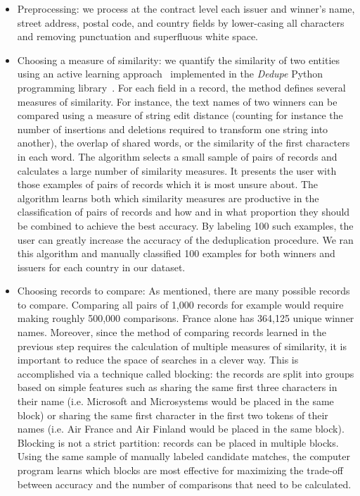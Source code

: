 \begin{itemize}
    \item Preprocessing: we process at the contract level each issuer and winner's name, street address, postal code, and country fields by lower-casing all characters and removing punctuation and superfluous white space. 
    \item Choosing a measure of similarity: we quantify the similarity of two entities using an active learning approach~\cite{sarawagi2002interactive} implemented in the \textit{Dedupe} Python programming library~\cite{gregg2015dedupe}. For each field in a record, the method defines several measures of similarity. For instance, the text names of two winners can be compared using a measure of string edit distance (counting for instance the number of insertions and deletions required to transform one string into another), the overlap of shared words, or the similarity of the first characters in each word. The algorithm selects a small sample of pairs of records and calculates a large number of similarity measures. It presents the user with those examples of pairs of records which it is most unsure about. The algorithm learns both which similarity measures are productive in the classification of pairs of records and how and in what proportion they should be combined to achieve the best accuracy. By labeling 100 such examples, the user can greatly increase the accuracy of the deduplication procedure. We ran this algorithm and manually classified 100 examples for both winners and issuers for each country in our dataset.
    \item Choosing records to compare: As mentioned, there are many possible records to compare. Comparing all pairs of 1,000 records for example would require making roughly 500,000 comparisons. France alone has 364,125 unique winner names. Moreover, since the method of comparing records learned in the previous step requires the calculation of multiple measures of similarity, it is important to reduce the space of searches in a clever way. This is accomplished via a technique called blocking: the records are split into groups based on simple features such as sharing the same first three characters in their name (i.e. Microsoft and Microsystems would be placed in the same block) or sharing the same first character in the first two tokens of their names (i.e. Air France and Air Finland would be placed in the same block). Blocking is not a strict partition: records can be placed in multiple blocks. Using the same sample of manually labeled candidate matches, the computer program learns which blocks are most effective for maximizing the trade-off between accuracy and the number of comparisons that need to be calculated.

\end{itemize}
